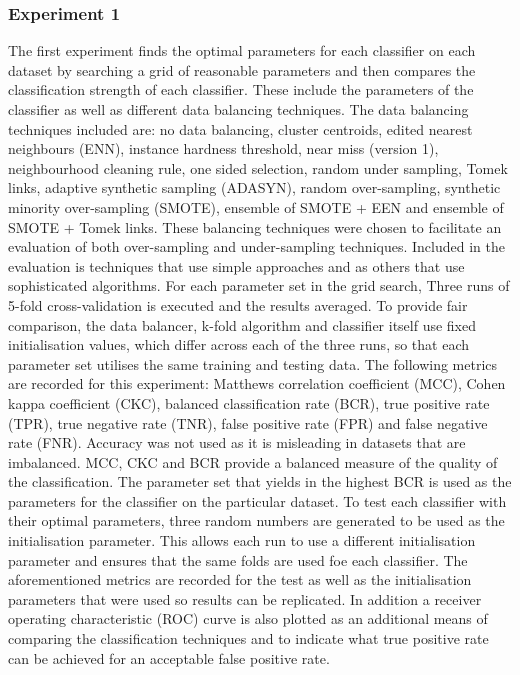 \documentclass{sig-alternate-05-2015}
\begin{document}
	\subsubsection{Experiment 1}
	The first experiment finds the optimal parameters for each classifier on each dataset by searching a grid of reasonable parameters and then compares the classification strength of each classifier. These include the parameters of the classifier as well as different data balancing techniques. The data balancing techniques included are: no data balancing, cluster centroids, edited nearest neighbours (ENN), instance hardness threshold, near miss (version 1), neighbourhood cleaning rule, one sided selection, random under sampling, Tomek links, adaptive synthetic sampling (ADASYN), random over-sampling, synthetic minority over-sampling (SMOTE), ensemble of SMOTE + EEN and ensemble of SMOTE + Tomek links. These balancing techniques were chosen to facilitate an evaluation of both over-sampling and under-sampling techniques. Included in the evaluation is techniques that use simple approaches and as others that use sophisticated algorithms. For each parameter set in the grid search, Three runs of 5-fold cross-validation is executed and the results averaged. To provide fair comparison, the data balancer, k-fold algorithm and classifier itself use fixed initialisation values, which differ across each of the three runs, so that each parameter set utilises the same training and testing data. The following metrics are recorded for this experiment: Matthews correlation coefficient (MCC), Cohen kappa coefficient (CKC), balanced classification rate (BCR), true positive rate (TPR), true negative rate (TNR), false positive rate (FPR) and false negative rate (FNR). Accuracy was not used as it is misleading in datasets that are imbalanced. MCC, CKC and BCR provide a balanced measure of the quality of the classification. The parameter set that yields in the highest BCR is used as the parameters for the classifier on the particular dataset. To test each classifier with their optimal parameters, three random numbers are generated to be used as the initialisation parameter. This allows each run to use a different initialisation parameter and ensures that the same folds are used foe each classifier. The aforementioned metrics are recorded for the test as well as the initialisation parameters that were used so results can be replicated. In addition a receiver operating characteristic (ROC) curve is also plotted as an additional means of comparing the classification techniques and to indicate what true positive rate can be achieved for an acceptable false positive rate. 
	
\end{document}
